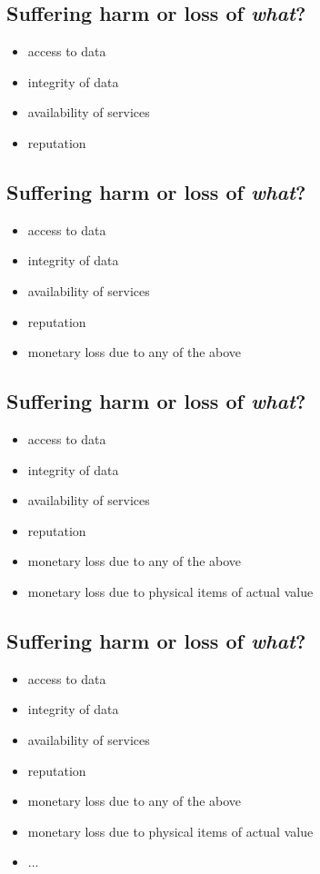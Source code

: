 \documentclass[xga]{xdvislides}
\begin{document}
\subsection{Suffering harm or loss of {\em what}?}

\begin{itemize}
	\item access to data
	\item integrity of data
	\item availability of services
	\item reputation
\end{itemize}

\subsection{Suffering harm or loss of {\em what}?}

\begin{itemize}
	\item access to data
	\item integrity of data
	\item availability of services
	\item reputation
	\item monetary loss due to any of the above
\end{itemize}

\subsection{Suffering harm or loss of {\em what}?}

\begin{itemize}
	\item access to data
	\item integrity of data
	\item availability of services
	\item reputation
	\item monetary loss due to any of the above
	\item monetary loss due to physical items of actual value
\end{itemize}

\subsection{Suffering harm or loss of {\em what}?}

\begin{itemize}
	\item access to data
	\item integrity of data
	\item availability of services
	\item reputation
	\item monetary loss due to any of the above
	\item monetary loss due to physical items of actual value
	\item ...
\end{itemize}
\end{document}
